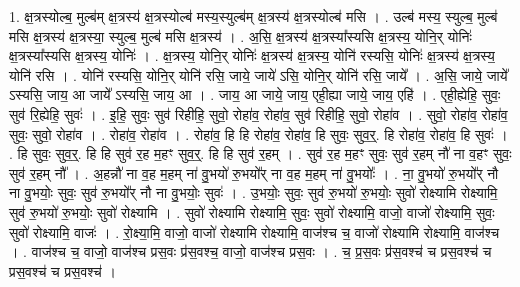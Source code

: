 \documentclass[17pt]{extarticle}
\begin{document}
1. क्ष॒त्रस्योल्ब॒ मुल्ब॑म् क्ष॒त्रस्य॑ क्ष॒त्रस्योल्ब॑ मस्य॒स्युल्ब॑म् क्ष॒त्रस्य॑ क्ष॒त्रस्योल्ब॑ मसि । . उल्ब॑ मस्य॒ स्युल्ब॒ मुल्ब॑ मसि क्ष॒त्रस्य॑ क्ष॒त्रस्या॒ स्युल्ब॒ मुल्ब॑ मसि क्ष॒त्रस्य॑ । . अ॒सि॒ क्ष॒त्रस्य॑ क्ष॒त्रस्या᳚स्यसि क्ष॒त्रस्य॒ योनि॒र् योनिः॑ क्ष॒त्रस्या᳚स्यसि क्ष॒त्रस्य॒ योनिः॑ । . क्ष॒त्रस्य॒ योनि॒र् योनिः॑ क्ष॒त्रस्य॑ क्ष॒त्रस्य॒ योनि॑ रस्यसि॒ योनिः॑ क्ष॒त्रस्य॑ क्ष॒त्रस्य॒ योनि॑ रसि । . योनि॑ रस्यसि॒ योनि॒र् योनि॑ रसि॒ जाये॒ जाये॑ ऽसि॒ योनि॒र् योनि॑ रसि॒ जाये᳚ । . अ॒सि॒ जाये॒ जाये᳚ ऽस्यसि॒ जाय॒ आ जाये᳚ ऽस्यसि॒ जाय॒ आ । . जाय॒ आ जाये॒ जाय॒ एही॒ह्या जाये॒ जाय॒ एहि॑ । . एही॒ह्येहि॒ सुवः॒ सुव॑ रि॒ह्येहि॒ सुवः॑ । . इ॒हि॒ सुवः॒ सुव॑ रिहीहि॒ सुवो॒ रोहा॑व॒ रोहा॑व॒ सुव॑ रिहीहि॒ सुवो॒ रोहा॑व । . सुवो॒ रोहा॑व॒ रोहा॑व॒ सुवः॒ सुवो॒ रोहा॑व । . रोहा॑व॒ रोहा॑व । . रोहा॑व॒ हि हि रोहा॑व॒ रोहा॑व॒ हि सुवः॒ सुव॒र्॒. हि रोहा॑व॒ रोहा॑व॒ हि सुवः॑ । . हि सुवः॒ सुव॒र्॒. हि हि सुव॑ र॒ह म॒हꣳ सुव॒र्॒. हि हि सुव॑ र॒हम् । . सुव॑ र॒ह म॒हꣳ सुवः॒ सुव॑ र॒हम् नौ॑ ना व॒हꣳ सुवः॒ सुव॑ र॒हम् नौ᳚ । . अ॒हन्नौ॑ ना व॒ह म॒हम् ना॑ वु॒भयो॑ रु॒भयो᳚र् ना व॒ह म॒हम् ना॑ वु॒भयोः᳚ । . ना॒ वु॒भयो॑ रु॒भयो᳚र् नौ ना वु॒भयोः॒ सुवः॒ सुव॑ रु॒भयो᳚र् नौ ना वु॒भयोः॒ सुवः॑ । . उ॒भयोः॒ सुवः॒ सुव॑ रु॒भयो॑ रु॒भयोः॒ सुवो॑ रोक्ष्यामि रोक्ष्यामि॒ सुव॑ रु॒भयो॑ रु॒भयोः॒ सुवो॑ रोक्ष्यामि । . सुवो॑ रोक्ष्यामि रोक्ष्यामि॒ सुवः॒ सुवो॑ रोक्ष्यामि॒ वाजो॒ वाजो॑ रोक्ष्यामि॒ सुवः॒ सुवो॑ रोक्ष्यामि॒ वाजः॑ । . रो॒क्ष्या॒मि॒ वाजो॒ वाजो॑ रोक्ष्यामि रोक्ष्यामि॒ वाज॑श्च च॒ वाजो॑ रोक्ष्यामि रोक्ष्यामि॒ वाज॑श्च । . वाज॑श्च च॒ वाजो॒ वाज॑श्च प्रस॒वः प्र॑स॒वश्च॒ वाजो॒ वाज॑श्च प्रस॒वः । . च॒ प्र॒स॒वः प्र॑स॒वश्च॑ च प्रस॒वश्च॑ च प्रस॒वश्च॑ च प्रस॒वश्च॑ । \newline
\end{document}
